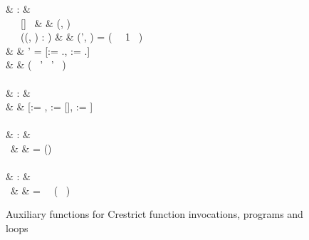 \begin{figure}[H]
\begin{functioncode}
{                                     &   :           & \State \rightarrow \Globals \rightarrow \Fundeclarations \rightarrow \Optiontype{\State \times \Globals} \\
 \ \Statevar \ \Globalsvar \ [] \         &   \triangleq  & (\Statevar, \Globalsvar) \\
 \ \Statevar \ \Globalsvar \ ((\Idvar, \Fundefvar) : \Fundclvar)
                                                                &   \triangleq  & \pseudolet (\Statevar', \Blockvar) = ( \ \Statevar \ 1 \ \false)\errbind \ \pseudoin \\
                                                                &               & \quad  \pseudolet \Globalsvar' = [\Globalsmemberenv := \Globalsvar.\Globalsmemberenv\set{\Idvar \leftarrow \Blockvar}, \Globalsmemberdefs := \Globalsvar.\Globalsmemberdefs\set{\Blockvar \leftarrow \Fundefvar}] \ \pseudoin \\
                                                                &               & \quad \quad ( \ \Statevar' \ \Globalsvar' \ \Fundclvar) \\~\\

                                          &   :           & \State \\
                                          &   \triangleq  & [\Memstatemember := \emptyset, \Restrictstatemember := [], \Scopesstatemember := \emptyset] \\~\\  

                                            &   :           & \Val \rightarrow \Booldomain \\
 \ \Valvar                                  &   \triangleq  & \pseudoif \Valvar = () \ \pseudothen \true \ \pseudoelse \false \\~\\

                                             &   :           & \Val \rightarrow \Booldomain \\
 \ \Valvar                                   &   \triangleq  & \pseudoif \Valvar = \vundef \ \pseudothen \false \ \pseudoelse \lnot ( \ \Valvar)


}
\end{functioncode}
\caption{Auxiliary functions for Crestrict function invocations, programs and loops}
\label{figure:auxiliary-functions-fun-invocations-programs}
\end{figure}

